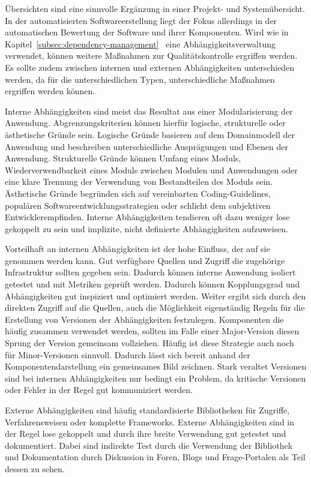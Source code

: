 Übersichten sind eine sinnvolle Ergänzung in einer Projekt- und Systemübersicht. In der automatisierten Softwareerstellung liegt der Fokus allerdings in der automatischen Bewertung der Software und ihrer Komponenten. Wird wie in Kapitel~\ref{subsec:dependency-management}~ eine Abhängigkeitsverwaltung verwendet, können weitere Maßnahmen zur Qualitätskontrolle ergriffen werden. Es sollte zudem zwischen internen und externen Abhängigkeiten unterschieden werden, da für die unterschiedlichen Typen, unterschiedliche Maßnahmen ergriffen werden können.

Interne Abhängigkeiten sind meist das Resultat aus einer Modularisierung der Anwendung. Abgrenzungskriterien können hierfür logische, strukturelle oder ästhetische Gründe sein. Logische Gründe basieren auf dem Domainmodell der Anwendung und beschreiben unterschiedliche Ausprägungen und Ebenen der Anwendung. Strukturelle Gründe können Umfang eines Moduls, Wiederverwendbarkeit eines Moduls zwischen Modulen und Anwendungen oder eine klare Trennung der Verwendung von Bestandteilen des Moduls sein. Ästhetische Gründe begründen sich auf vereinbarten Coding-Guidelines, populären Softwareentwicklungsstrategien oder schlicht dem subjektiven Entwicklerempfinden. Interne Abhängigkeiten tendieren oft dazu weniger lose gekoppelt zu sein und implizite, nicht definierte Abhängigkeiten aufzuweisen.

Vorteilhaft an internen Abhängigkeiten ist der hohe Einfluss, der auf sie genommen werden kann. Gut verfügbare Quellen und Zugriff die zugehörige Infrastruktur sollten gegeben sein. Dadurch können interne Anwendung isoliert getestet und mit Metriken geprüft werden. Dadurch können Kopplungsgrad und Abhängigkeiten gut inspiziert und optimiert werden. Weiter ergibt sich durch den direkten Zugriff auf die Quellen, auch die Möglichkeit eigenständig Regeln für die Erstellung von Versionen der Abhängigkeiten festzulegen. Komponenten die häufig zusammen verwendet werden, sollten im Falle einer Major-Version diesen Sprung der Version gemeinsam vollziehen. Häufig ist diese Strategie auch noch für Minor-Versionen sinnvoll. Dadurch lässt sich bereit anhand der Komponentendarstellung ein gemeinsames Bild zeichnen. Stark veraltet Versionen sind bei internen Abhängigkeiten nur bedingt ein Problem, da kritische Versionen oder Fehler in der Regel gut kommuniziert werden.

Externe Abhängigkeiten sind häufig standardisierte Bibliotheken für Zugriffe, Verfahrensweisen oder komplette Frameworks. Externe Abhängigkeiten sind in der Regel lose gekoppelt und durch ihre breite Verwendung gut getestet und dokumentiert. Dabei sind indirekte Test durch die Verwendung der Bibliothek und Dokumentation durch Diskussion in Foren, Blogs und Frage-Portalen als Teil dessen zu sehen. 

